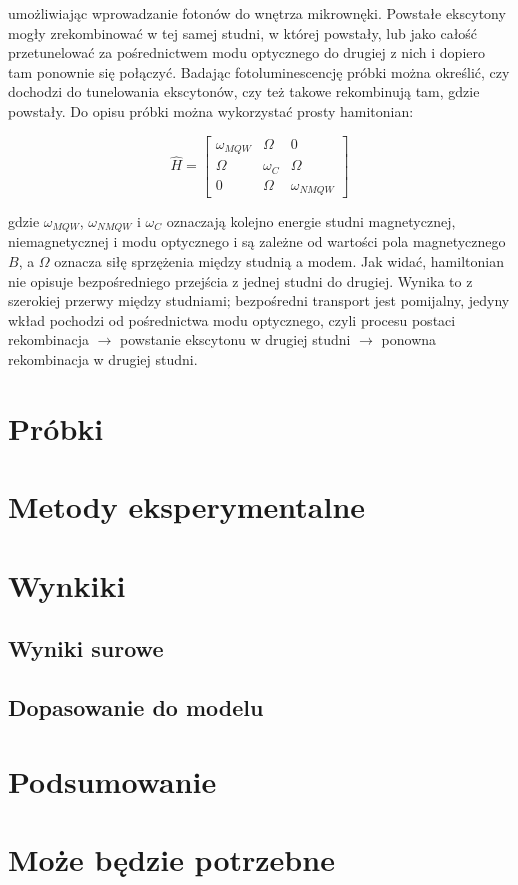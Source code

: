 \documentclass[licencjacka]{pracamgr}
\begin{document}
umożliwiając wprowadzanie fotonów do wnętrza mikrownęki. Powstałe ekscytony mogły zrekombinować w tej samej studni, w której powstały, lub jako całość przetunelować za pośrednictwem modu optycznego do drugiej z nich i dopiero tam ponownie się połączyć. Badając fotoluminescencję próbki można określić, czy dochodzi do tunelowania ekscytonów, czy też takowe rekombinują tam, gdzie powstały. Do opisu próbki można wykorzystać prosty hamitonian:

\begin{equation}
\hat{H}=
\begin{bmatrix}
\omega_{MQW} & \Omega &0 \\
\Omega & \omega_{C} & \Omega \\
0 & \Omega & \omega_{NMQW}
\end{bmatrix}  
\end{equation}

gdzie $\omega_{MQW}$, $\omega_{NMQW}$ i $\omega_{C}$ oznaczają kolejno energie studni magnetycznej, niemagnetycznej i modu optycznego i są zależne od wartości pola magnetycznego $B$, a $\Omega$ oznacza siłę sprzężenia między studnią a modem. Jak widać, hamiltonian nie opisuje bezpośredniego przejścia z jednej studni do drugiej. Wynika to z szerokiej przerwy między studniami; bezpośredni transport jest pomijalny, jedyny wkład pochodzi od pośrednictwa modu optycznego, czyli procesu postaci rekombinacja $\rightarrow$ powstanie ekscytonu w drugiej studni $\rightarrow$ ponowna rekombinacja w drugiej studni.

\chapter{Próbki}\label{r:probki}



\chapter{Metody eksperymentalne}\label{r:metody}



\chapter{Wynkiki}\label{r:wyniki}
\section{Wyniki surowe}
\section{Dopasowanie do modelu}




\chapter{Podsumowanie}


\appendix

\chapter{Może będzie potrzebne}



\end{document}
